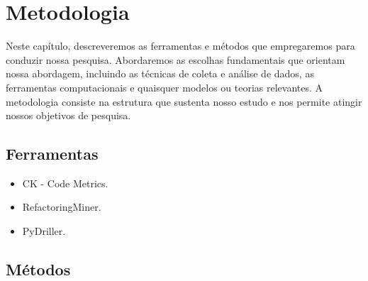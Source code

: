 
\chapter{Metodologia}\label{cap:Metodologia}
Neste capítulo, descreveremos as ferramentas e métodos que empregaremos para conduzir nossa pesquisa. Abordaremos as escolhas fundamentais que orientam nossa abordagem, incluindo as técnicas de coleta e análise de dados, as ferramentas computacionais e quaisquer modelos ou teorias relevantes. A metodologia consiste na estrutura que sustenta nosso estudo e nos permite atingir nossos objetivos de pesquisa.

\section{Ferramentas}\label{sec:ferramentas}

\begin{itemize}
    \item CK - Code Metrics.
    \item RefactoringMiner.
    \item PyDriller.
\end{itemize}

\section{Métodos}\label{sec:metodo}
